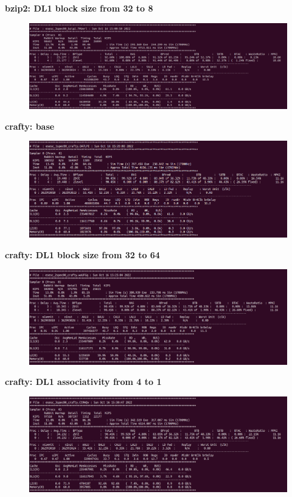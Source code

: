 \documentclass[12pt]{article}
\begin{document}
\textbf{bzip2: DL1 block size from 32 to 8}
\begin{figure}[h!]
	\includegraphics[scale=0.4]{img/bzip3.png}
\end{figure}
\newpage

\textbf{crafty: base}
\begin{figure}[h!]
	\includegraphics[scale=0.3]{img/crafty1.png}
\end{figure}

\textbf{crafty: DL1 block size from 32 to 64}
\begin{figure}[h!]
	\includegraphics[scale=0.3]{img/crafty2.png}
\end{figure}

\textbf{crafty: DL1 associativity from 4 to 1}
\begin{figure}[h!]
	\includegraphics[scale=0.3]{img/crafty3.png}
\end{figure}
\newpage
\end{document}
